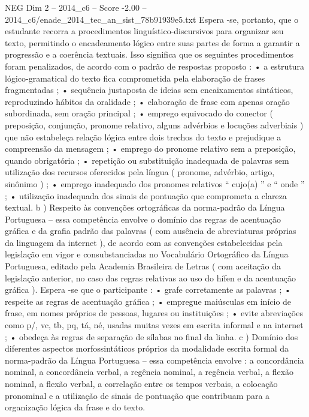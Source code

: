 \begin{textsample}{NEG Dim 2 – 2014\_c6 – Score -2.00 – 2014\_c6/enade\_2014\_tec\_an\_sist\_78b91939e5.txt}
Espera -se, portanto, que o estudante recorra a procedimentos linguístico-discursivos para organizar seu texto, permitindo o encadeamento lógico entre suas partes de forma a garantir a progressão e a coerência textuais.
Isso significa que os seguintes procedimentos foram penalizados, de acordo com o padrão de respostas proposto : • a estrutura lógico-gramatical do texto fica comprometida pela elaboração de frases fragmentadas ; • sequência justaposta de ideias sem encaixamentos sintáticos, reproduzindo hábitos da oralidade ; • elaboração de frase com apenas oração subordinada, sem oração principal ; • emprego equivocado do conector ( preposição, conjunção, pronome relativo, alguns advérbios e locuções adverbiais ) que não estabeleça relação lógica entre dois trechos do texto e prejudique a compreensão da mensagem ; • emprego do pronome relativo sem a preposição, quando obrigatória ; • repetição ou substituição inadequada de palavras sem utilização dos recursos oferecidos pela língua ( pronome, advérbio, artigo, sinônimo ) ; • emprego inadequado dos pronomes relativos “ cujo(a) ” e “ onde ” ; • utilização inadequada dos sinais de pontuação que comprometa a clareza textual. b ) Respeito às convenções ortográficas da norma-padrão da Língua Portuguesa – essa competência envolve o domínio das regras de acentuação gráfica e da grafia padrão das palavras ( com ausência de abreviaturas próprias da linguagem da internet ), de acordo com as convenções estabelecidas pela legislação em vigor e consubstanciadas no Vocabulário Ortográfico da Língua Portuguesa, editado pela Academia Brasileira de Letras ( com aceitação da legislação anterior, no caso das regras relativas ao uso do hífen e da acentuação gráfica ).
Espera -se que o participante : • grafe corretamente as palavras ; • respeite as regras de acentuação gráfica ; • empregue maiúsculas em início de frase, em nomes próprios de pessoas, lugares ou instituições ; • evite abreviações como p/, vc, tb, pq, tá, né, usadas muitas vezes em escrita informal e na internet ; • obedeça às regras de separação de sílabas no final da linha. c ) Domínio dos diferentes aspectos morfossintáticos próprios da modalidade escrita formal da norma-padrão da Língua Portuguesa – essa competência envolve : a concordância nominal, a concordância verbal, a regência nominal, a regência verbal, a flexão nominal, a flexão verbal, a correlação entre os tempos verbais, a colocação pronominal e a utilização de sinais de pontuação que contribuam para a organização lógica da frase e do texto.

\end{textsample}
